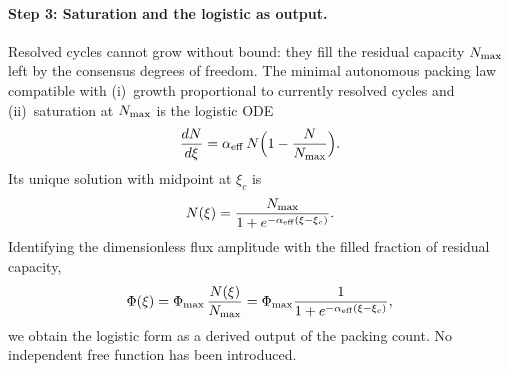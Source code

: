 \documentclass[11pt,a4paper]{article}
\begin{document}
\paragraph{Step 3: Saturation and the logistic as output.}
Resolved cycles cannot grow without bound: they fill the residual capacity \(N_{\rm max}\) left by the consensus degrees of freedom. The minimal autonomous packing law compatible with (i)~growth proportional to currently resolved cycles and (ii)~saturation at \(N_{\rm max}\) is the logistic ODE
\begin{equation}
\frac{dN}{d\xi}=\alpha_{\rm eff}\,N\Bigl(1-\frac{N}{N_{\rm max}}\Bigr).
\label{eq:packing-ODE}
\end{equation}
Its unique solution with midpoint at \(\xi_c\) is
\begin{equation}
N(\xi)=\frac{N_{\rm max}}{1+e^{-\alpha_{\rm eff}(\xi-\xi_c)}}.
\label{eq:N-logistic}
\end{equation}
Identifying the dimensionless flux amplitude with the filled fraction of residual capacity,
\begin{equation}
\Phi(\xi)=\Phi_{\rm max}\,\frac{N(\xi)}{N_{\rm max}}
=\Phi_{\rm max}\frac{1}{1+e^{-\alpha_{\rm eff}(\xi-\xi_c)}},
\label{eq:logistic}
\end{equation}
we obtain the logistic form as a derived output of the packing count. No independent free function has been introduced.
\end{document}
